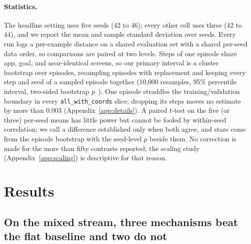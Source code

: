 \documentclass{article}
\newcommand{\mix}[1]{\texttt{#1}}
\begin{document}
\paragraph{Statistics.}
The headline setting uses five seeds (42 to 46); every other cell uses three (42 to 44), and we report the mean and sample standard deviation over seeds. Every run logs a per-example distance on a shared evaluation set with a shared per-seed data order, so comparisons are paired at two levels. Steps of one episode share app, goal, and near-identical screens, so our primary interval is a cluster bootstrap over episodes, resampling episodes with replacement and keeping every step and seed of a sampled episode together (10,000 resamples, 95\% percentile interval, two-sided bootstrap $p$~\citep{efron}). One episode straddles the training/validation boundary in every \mix{all\_with\_coords} slice; dropping its steps moves no estimate by more than 0.003 (Appendix~\ref{app:details}). A paired $t$-test on the five (or three) per-seed means has little power but cannot be fooled by within-seed correlation; we call a difference established only when both agree, and stars come from the episode bootstrap with the seed-level $p$ beside them. No correction is made for the more than fifty contrasts reported; the scaling study (Appendix~\ref{app:scaling}) is descriptive for that reason.

\section{Results}
\label{sec:results}

\subsection{On the mixed stream, three mechanisms beat the flat baseline and two do not}
\label{sec:headline}


\end{document}
